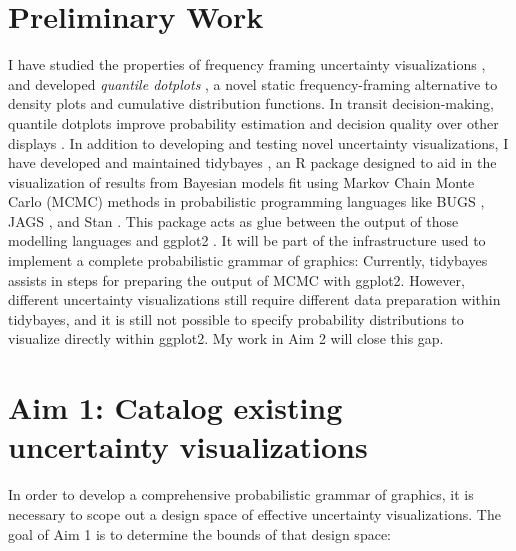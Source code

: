 \documentclass[11pt]{article}
\begin{document}
\section{Preliminary Work}

\noindent I have studied the properties of frequency framing uncertainty visualizations \cite{kale2018hypothetical,hullman2018imagining,hullman2018pursuit,kay2016bus,Fernandes2018}, and developed \emph{quantile dotplots} \cite{kay2016bus,Fernandes2018}, a novel static frequency-framing alternative to density plots and cumulative distribution functions. In transit decision-making, quantile dotplots improve probability estimation and decision quality over other displays \cite{kay2016bus,Fernandes2018}. In addition to developing and testing novel uncertainty visualizations, I have developed and maintained tidybayes \cite{kay2017tidybayes}, an R package designed to aid in the visualization of results from Bayesian models fit using Markov Chain Monte Carlo (MCMC) methods in probabilistic programming languages like BUGS \cite{lunn2009bugs, lunn2000winbugs}, JAGS \cite{plummer2003jags}, and Stan \cite{carpenter2017stan}. This package acts as glue between the output of those modelling languages and ggplot2 \cite{wickham2016ggplot2}. It will be part of the infrastructure used to implement a complete probabilistic grammar of graphics: Currently, tidybayes assists in steps for preparing the output of MCMC with ggplot2. However, different uncertainty visualizations still require different data preparation within tidybayes, and it is still not possible to specify probability distributions to visualize directly within ggplot2. My work in Aim 2 will close this gap.





\section{Aim 1: Catalog existing uncertainty visualizations}

\noindent In order to develop a comprehensive probabilistic grammar of graphics, it is necessary to scope out a design space of effective uncertainty visualizations. The goal of Aim 1 is to determine the bounds of that design space:

\noindent\hrulefill
\vspace{-0.5em}
\end{document}

